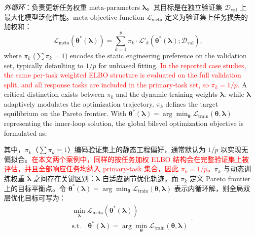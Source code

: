 \documentclass[11pt]{article}
\begin{document}
\textit{外循环}：负责更新任务权重 meta-parameters $\boldsymbol{\lambda}$。其目标是在独立验证集 $\mathcal{D}_{\text{val}}$ 上最大化模型泛化性能。meta-objective function $\mathcal{L}_{\text{meta}}$ 定义为验证集上任务损失的加权和：
\begin{equation}
	{{\mathcal{L}}_{\text{meta}}}({{\boldsymbol{\theta }}^{*}}(\boldsymbol{\lambda }))=\sum\limits_{k=1}^{p}{{{\pi }_{k}}}\cdot {{{\mathcal{L}}'}_{k}}({{\boldsymbol{\theta }}^{*}}(\boldsymbol{\lambda });{{\mathcal{D}}_{\text{val}}}),
\end{equation}
where $\pi_k$ ($\sum \pi_k = 1$) encodes the static engineering preference on the validation set, typically defaulting to $1/p$ for unbiased fitting. \textcolor{red}{In the reported case studies, the same per-task weighted ELBO structure is evaluated on the full validation split, and all response tasks are included in the primary-task set, so $\pi_k = 1/p$.} A critical distinction exists between $\pi_k$ and the dynamic training weights $\boldsymbol{\lambda}$: while $\boldsymbol{\lambda}$ adaptively modulates the optimization trajectory, $\pi_k$ defines the target equilibrium on the Pareto frontier. With $\boldsymbol{\theta}^*(\boldsymbol{\lambda}) = \arg \min_{\boldsymbol{\theta}} \mathcal{L}_{\text{train}}(\boldsymbol{\theta}, \boldsymbol{\lambda})$ representing the inner-loop solution, the global bilevel optimization objective is formulated as:

其中，$\pi_k$（$\sum \pi_k = 1$）编码验证集上的静态工程偏好，通常默认为 $1/p$ 以实现无偏拟合。\textcolor{red}{在本文两个案例中，同样的按任务加权 ELBO 结构会在完整验证集上被评估，并且全部响应任务均纳入 primary-task 集合，因此 $\pi_k = 1/p$。}$\pi_k$ 与动态训练权重 $\boldsymbol{\lambda}$ 之间存在关键区别：$\boldsymbol{\lambda}$ 自适应调节优化轨迹，而 $\pi_k$ 定义 Pareto frontier 上的目标平衡点。令 $\boldsymbol{\theta}^*(\boldsymbol{\lambda}) = \arg \min_{\boldsymbol{\theta}} \mathcal{L}_{\text{train}}(\boldsymbol{\theta}, \boldsymbol{\lambda})$ 表示内循环解，则全局双层优化目标可写为：
\begin{equation}
	\begin{aligned}
		& \min_{\boldsymbol{\lambda}} \mathcal{L}_{\text{meta}}(\boldsymbol{\theta}^*(\boldsymbol{\lambda})) \\
		& \text{s.t.} \quad \boldsymbol{\theta}^*(\boldsymbol{\lambda}) = \arg \min_{\boldsymbol{\theta}} \mathcal{L}_{\text{train}}(\boldsymbol{\theta}, \boldsymbol{\lambda})
	\end{aligned}.
\end{equation}
\end{document}

